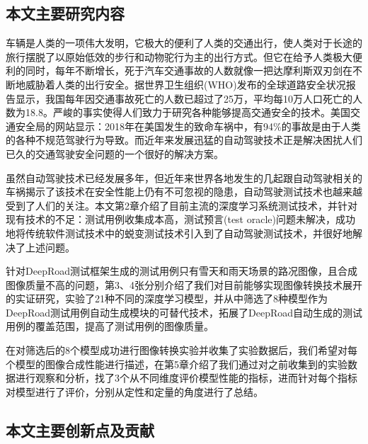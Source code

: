 \subsection{本文主要研究内容}

车辆是人类的一项伟大发明，它极大的便利了人类的交通出行，使人类对于长途的旅行摆脱了以原始低效的步行和动物驼行为主的出行方式。但它在给予人类极大便利的同时，每年不断增长，死于汽车交通事故的人数就像一把达摩利斯双刃剑在不断地威胁着人类的出行安全。据世界卫生组织(WHO)发布的全球道路安全状况报告\cite{who}显示，我国每年因交通事故死亡的人数已超过了25万，平均每10万人口死亡的人数为18.8。严峻的事实使得人们致力于研究各种能够提高交通安全的技术。美国交通安全局的网站\cite{usdt}显示：2018年在美国发生的致命车祸中，有94\%的事故是由于人类的各种不规范驾驶行为导致。而近年来发展迅猛的自动驾驶技术正是解决困扰人们已久的交通驾驶安全问题的一个很好的解决方案。

虽然自动驾驶技术已经发展多年，但近年来世界各地发生的几起跟自动驾驶相关的车祸揭示了该技术在安全性能上仍有不可忽视的隐患，自动驾驶测试技术也越来越受到了人们的关注。本文第2章介绍了目前主流的深度学习系统测试技术，并针对现有技术的不足：测试用例收集成本高，测试预言(test oracle)问题未解决，成功地将传统软件测试技术中的蜕变测试技术引入到了自动驾驶测试技术，并很好地解决了上述问题。

针对DeepRoad测试框架生成的测试用例只有雪天和雨天场景的路况图像，且合成图像质量不高的问题，第3、4张分别介绍了我们对目前能够实现图像转换技术展开的实证研究，实验了21种不同的深度学习模型，并从中筛选了8种模型作为DeepRoad测试用例自动生成模块的可替代技术，拓展了DeepRoad自动生成的测试用例的覆盖范围，提高了测试用例的图像质量。

在对筛选后的8个模型成功进行图像转换实验并收集了实验数据后，我们希望对每个模型的图像合成性能进行描述，在第5章介绍了我们通过对之前收集到的实验数据进行观察和分析，找了3个从不同维度评价模型性能的指标，进而针对每个指标对模型进行了评价，分别从定性和定量的角度进行了总结。

\subsection{本文主要创新点及贡献}

